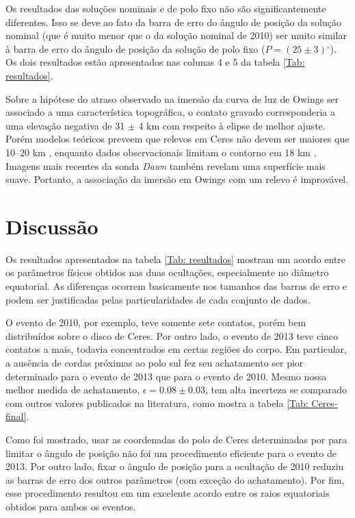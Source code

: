 \documentclass[12pt,a4paper]{monografia}
\newcommand{\degr}{\ensuremath{^{\circ}}}%
\begin{document}
Os resultados das soluções nominais e de polo fixo não são significantemente diferentes. Isso se deve ao fato da barra de erro do ângulo de posição da solução nominal (que é muito menor que o da solução nominal de 2010) ser muito similar à barra de erro do ângulo de posição da solução de polo fixo ($P = (25 \pm 3)\degr$). Os dois resultados estão apresentados nas colunas 4 e 5 da tabela \ref{Tab: resultados}.

Sobre a hipótese do atraso observado na imersão da curva de luz de Owings ser associado a uma característica topográfica, o contato gravado corresponderia a uma elevação negativa de 31 $\pm$ 4 km com respeito à elipse de melhor ajuste. Porém modelos teóricos preveem que relevos em Ceres não devem ser maiores que 10--20 km \citep{Johnson1973}, enquanto dados observacionais limitam o contorno em 18 km \citep{Carry2008}. Imagens mais recentes da sonda \textit{Dawn} também revelam uma superfície mais suave. Portanto, a associação da imersão em Owings com um relevo é improvável.

\section{Discussão}

\indent \indent Os resultados apresentados na tabela \ref{Tab: resultados} mostram um acordo entre os parâmetros físicos obtidos nas duas ocultações, especialmente no diâmetro equatorial. As diferenças ocorrem basicamente nos tamanhos das barras de erro e podem ser justificadas pelas particularidades de cada conjunto de dados.

O evento de 2010, por exemplo, teve somente sete contatos, porém bem distribuídos sobre o disco de Ceres. Por outro lado, o evento de 2013 teve cinco contatos a mais, todavia concentrados em certas regiões do corpo. Em particular, a ausência de cordas próximas ao polo sul fez seu achatamento ser pior determinado para o evento de 2013 que para o evento de 2010. Mesmo nossa melhor medida de achatamento, $\epsilon=0.08 \pm 0.03$, tem alta incerteza se comparado com outros valores publicados na literatura, como mostra a tabela \ref{Tab: Ceres-final}.

Como foi mostrado, usar as coordenadas do polo de Ceres determinadas por \cite{Drummond2014} para limitar o ângulo de posição não foi um procedimento eficiente para o evento de 2013. Por outro lado, fixar o ângulo de posição para a ocultação de 2010 reduziu as barras de erro dos outros parâmetros (com exceção do achatamento). Por fim, esse procedimento resultou em um excelente acordo entre os raios equatoriais obtidos para ambos os eventos.
\end{document}
